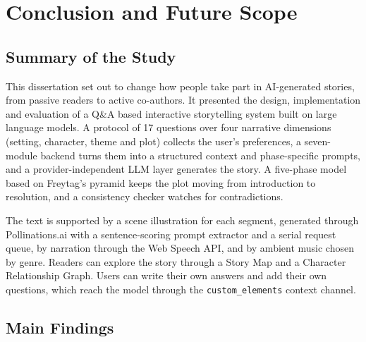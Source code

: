 \chapter{Conclusion and Future Scope}
\label{ch:conclusion}

\section{Summary of the Study}

This dissertation set out to change how people take part in AI-generated stories, from passive readers to active co-authors. It presented the design, implementation and evaluation of a Q\&A based interactive storytelling system built on large language models. A protocol of 17 questions over four narrative dimensions (setting, character, theme and plot) collects the user's preferences, a seven-module backend turns them into a structured context and phase-specific prompts, and a provider-independent LLM layer generates the story. A five-phase model based on Freytag's pyramid keeps the plot moving from introduction to resolution, and a consistency checker watches for contradictions.

The text is supported by a scene illustration for each segment, generated through Pollinations.ai with a sentence-scoring prompt extractor and a serial request queue, by narration through the Web Speech API, and by ambient music chosen by genre. Readers can explore the story through a Story Map and a Character Relationship Graph. Users can write their own answers and add their own questions, which reach the model through the \texttt{custom\_elements} context channel.

\section{Main Findings}

